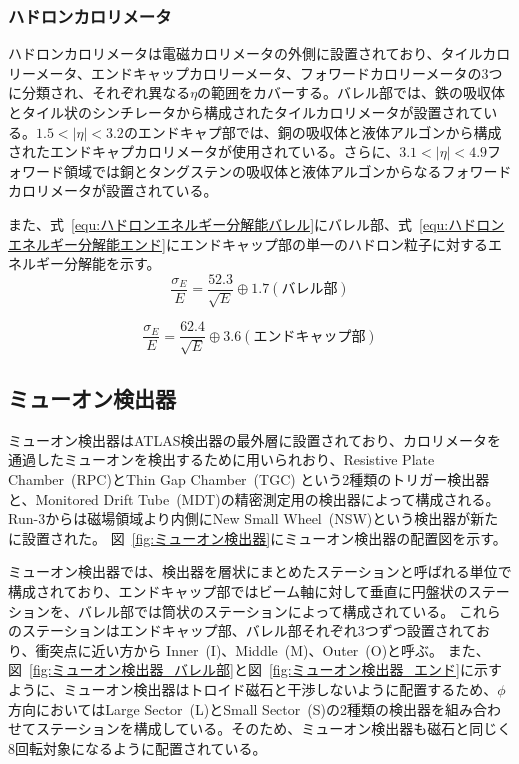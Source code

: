 \subsubsection{ハドロンカロリメータ}
ハドロンカロリメータは電磁カロリメータの外側に設置されており、タイルカロリーメータ、エンドキャップカロリーメータ、フォワードカロリーメータの3つに分類され、それぞれ異なる$\eta$の範囲をカバーする。バレル部では、鉄の吸収体とタイル状のシンチレータから構成されたタイルカロリメータが設置されている。$1.5 < |\eta| < 3.2$のエンドキャプ部では、銅の吸収体と液体アルゴンから構成されたエンドキャプカロリメータが使用されている。さらに、$3.1 < |\eta| < 4.9$フォワード領域では銅とタングステンの吸収体と液体アルゴンからなるフォワードカロリメータが設置されている。

また、式~\eqref{equ:ハドロンエネルギー分解能バレル}にバレル部、式~\eqref{equ:ハドロンエネルギー分解能エンド}にエンドキャップ部の単一のハドロン粒子に対するエネルギー分解能を示す。
\begin{equation}
    \frac{\sigma_{E}}{E} = \frac{52.3}{\sqrt{E}}\oplus 1.7　(バレル部)
　\label{equ:ハドロンエネルギー分解能バレル}
\end{equation}

\begin{equation}
    \frac{\sigma_{E}}{E} = \frac{62.4}{\sqrt{E}}\oplus 3.6　(エンドキャップ部)
　\label{equ:ハドロンエネルギー分解能エンド}
\end{equation}

\subsection{ミューオン検出器}\label{section2-2-4}
ミューオン検出器はATLAS検出器の最外層に設置されており、カロリメータを通過したミューオンを検出するために用いられおり、Resistive Plate Chamber~(RPC)とThin Gap Chamber~(TGC) という2種類のトリガー検出器と、Monitored Drift Tube~(MDT)の精密測定用の検出器によって構成される。Run-3からは磁場領域より内側にNew Small Wheel~(NSW)という検出器が新たに設置された。
図~\ref{fig:ミューオン検出器}にミューオン検出器の配置図を示す。

ミューオン検出器では、検出器を層状にまとめたステーションと呼ばれる単位で構成されており、エンドキャップ部ではビーム軸に対して垂直に円盤状のステーションを、バレル部では筒状のステーションによって構成されている。
これらのステーションはエンドキャップ部、バレル部それぞれ3つずつ設置されており、衝突点に近い方から Inner~(I)、Middle~(M)、Outer~(O)と呼ぶ。
また、図~\ref{fig:ミューオン検出器_バレル部}と図~\ref{fig:ミューオン検出器_エンド}に示すように、ミューオン検出器はトロイド磁石と干渉しないように配置するため、$\phi$方向においてはLarge Sector~(L)とSmall Sector~(S)の2種類の検出器を組み合わせてステーションを構成している。そのため、ミューオン検出器も磁石と同じく8回転対象になるように配置されている。


